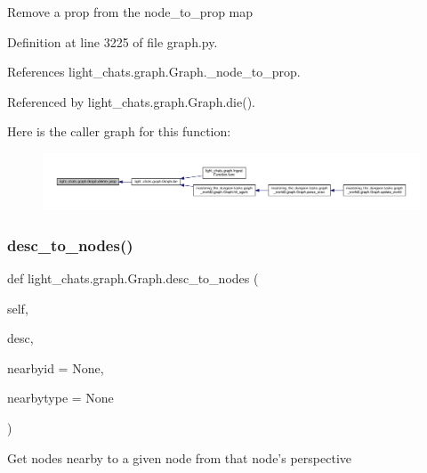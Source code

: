 \begin{DoxyVerb}Remove a prop from the node_to_prop map\end{DoxyVerb}
 

Definition at line 3225 of file graph.\+py.



References light\+\_\+chats.\+graph.\+Graph.\+\_\+node\+\_\+to\+\_\+prop.



Referenced by light\+\_\+chats.\+graph.\+Graph.\+die().

Here is the caller graph for this function\+:
\nopagebreak
\begin{figure}[H]
\begin{center}
\leavevmode
\includegraphics[width=350pt]{classlight__chats_1_1graph_1_1Graph_ac98ed988f74d9571e195aa9592f84b76_icgraph}
\end{center}
\end{figure}
\mbox{\label{classlight__chats_1_1graph_1_1Graph_a67fd9624112a695cd6e1a0b92ec3139b}} 
\subsubsection{\texorpdfstring{desc\+\_\+to\+\_\+nodes()}{desc\_to\_nodes()}}
{\footnotesize\ttfamily def light\+\_\+chats.\+graph.\+Graph.\+desc\+\_\+to\+\_\+nodes (\begin{DoxyParamCaption}\item[{}]{self,  }\item[{}]{desc,  }\item[{}]{nearbyid = {\ttfamily None},  }\item[{}]{nearbytype = {\ttfamily None} }\end{DoxyParamCaption})}

\begin{DoxyVerb}Get nodes nearby to a given node from that node's perspective\end{DoxyVerb}
 

